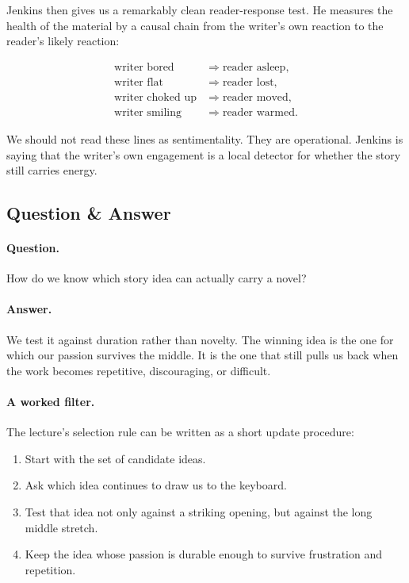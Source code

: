 Jenkins then gives us a remarkably clean reader-response test. He measures the health of the material by a causal chain from the writer's own reaction to the reader's likely reaction:

\begin{align}
\text{writer bored} &\Rightarrow \text{reader asleep},\\
\text{writer flat} &\Rightarrow \text{reader lost},\\
\text{writer choked up} &\Rightarrow \text{reader moved},\\
\text{writer smiling} &\Rightarrow \text{reader warmed}.
\end{align}

We should not read these lines as sentimentality. They are operational. Jenkins is saying that the writer's own engagement is a local detector for whether the story still carries energy.

\subsection{Question \& Answer}

\paragraph{Question.} How do we know which story idea can actually carry a novel?

\paragraph{Answer.} We test it against duration rather than novelty. The winning idea is the one for which our passion survives the middle. It is the one that still pulls us back when the work becomes repetitive, discouraging, or difficult.

\paragraph{A worked filter.} The lecture's selection rule can be written as a short update procedure:

\begin{enumerate}
\item Start with the set of candidate ideas.
\item Ask which idea continues to draw us to the keyboard.
\item Test that idea not only against a striking opening, but against the long middle stretch.
\item Keep the idea whose passion is durable enough to survive frustration and repetition.
\end{enumerate}

